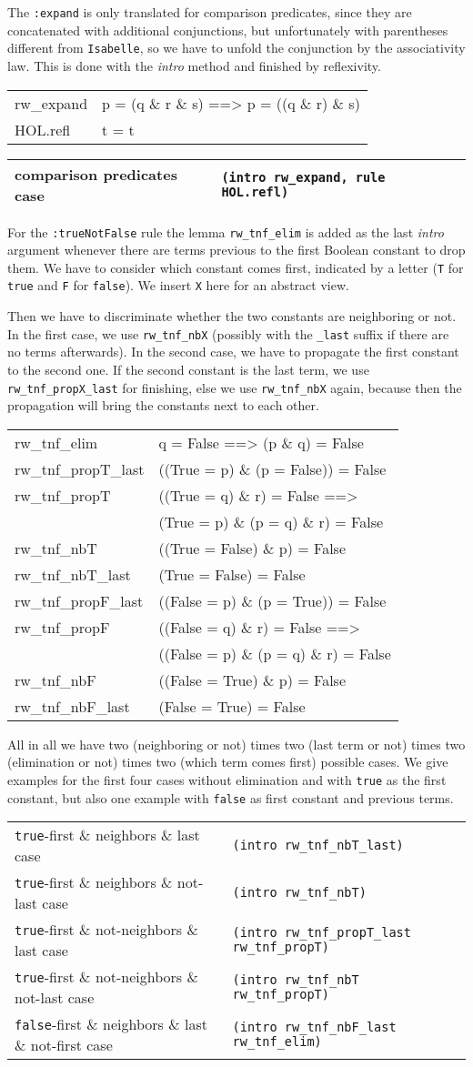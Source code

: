 \documentclass[10pt,a4paper]{article}
\newcommand{\isa}{\texttt{Isabelle}\xspace}
\newcommand{\ttt}{\texttt}
\newcommand{\true}{\ttt{true}\xspace}
\newcommand{\false}{\ttt{false}\xspace}
\newenvironment{pt}[1]{\begin{center}\begin{tt}\begin{tabular}{#1}\hline}{\end{tabular}\end{tt}\end{center}}
\newcommand{\pl}[1]{#1 \\[1mm]}
\newcommand{\pll}[1]{#1 \\\hline}
\newenvironment{rt}{\begin{center}\begin{tabular}{|l l|}\hline}{\end{tabular}\end{center}}
\newcommand{\rl}[2]{\rm{#1} & \tt{#2} \\[1mm]}
\newcommand{\rll}[2]{\rm{#1} & \tt{#2} \\\hline}
\def\ind{\quad}
\begin{document}
\smallskip

The \ttt{:expand} is only translated for comparison predicates, since they are concatenated with additional conjunctions, but unfortunately with parentheses different from \isa, so we have to unfold the conjunction by the associativity law. This is done with the \emph{intro} method and finished by reflexivity.
%
\begin{pt}{ll}
	\pl{rw\_expand & p = (q \& r \& s) ==> p = ((q \& r) \& s)}
	\pll{HOL.refl & t = t}
\end{pt}
%
\begin{rt}
	\rll{comparison predicates case}{(intro rw\_expand, rule HOL.refl)}
\end{rt}

For the \ttt{:trueNotFalse} rule the lemma \ttt{rw\_tnf\_elim} is added as the last \emph{intro} argument whenever there are terms previous to the first Boolean constant to drop them. We have to consider which constant comes first, indicated by a letter (\ttt{T} for \true and \ttt{F} for \false). We insert \ttt{X} here for an abstract view.

Then we have to discriminate whether the two constants are neighboring or not. In the first case, we use \ttt{rw\_tnf\_nbX} (possibly with the \ttt{\_last} suffix if there are no terms afterwards). In the second case, we have to propagate the first constant to the second one. If the second constant is the last term, we use \ttt{rw\_tnf\_propX\_last} for finishing, else we use \ttt{rw\_tnf\_nbX} again, because then the propagation will bring the constants next to each other.
%
\begin{pt}{ll}
	\pl{rw\_tnf\_elim & q = False ==> (p \& q) = False}
	\pl{rw\_tnf\_propT\_last & ((True = p) \& (p = False)) = False}
	\pl{rw\_tnf\_propT & ((True = q) \& r) = False ==>}
		\pl{& \ind (True = p) \& (p = q) \& r) = False}
	\pl{rw\_tnf\_nbT & ((True = False) \& p) = False}
	\pl{rw\_tnf\_nbT\_last & (True = False) = False}
	\pl{rw\_tnf\_propF\_last & ((False = p) \& (p = True)) = False}
	\pl{rw\_tnf\_propF & ((False = q) \& r) = False ==>}
		\pl{& \ind ((False = p) \& (p = q) \& r) = False}
	\pl{rw\_tnf\_nbF & ((False = True) \& p) = False}
	\pll{rw\_tnf\_nbF\_last & (False = True) = False}
\end{pt}

All in all we have two (neighboring or not) times two (last term or not) times two (elimination or not) times two (which term comes first) possible cases. We give examples for the first four cases without elimination and with \true as the first constant, but also one example with \false as first constant and previous terms.
%
\begin{rt}
	\rl{\true-first \& neighbors \& last case}{(intro rw\_tnf\_nbT\_last)}
	\rl{\true-first \& neighbors \& not-last case}{(intro rw\_tnf\_nbT)}
	\rl{\true-first \& not-neighbors \& last case}{(intro rw\_tnf\_propT\_last rw\_tnf\_propT)}
	\rl{\true-first \& not-neighbors \& not-last case}{(intro rw\_tnf\_nbT rw\_tnf\_propT)}
	\hline
	\rll{\false-first \& neighbors \& last \& not-first case}{(intro rw\_tnf\_nbF\_last rw\_tnf\_elim)}
\end{rt}
\end{document}
